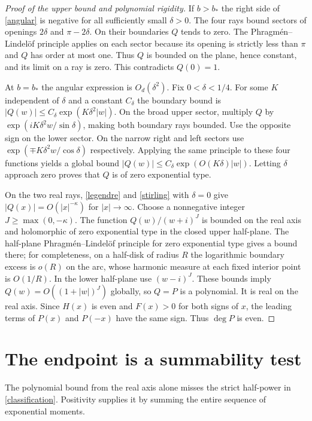 \documentclass[11pt]{article}
\begin{document}
\begin{proof}[Proof of the upper bound and polynomial rigidity]
If $b>b_*$ the right side of \eqref{angular} is negative for all sufficiently small $\delta>0$. The four rays bound sectors of openings $2\delta$ and $\pi-2\delta$. On their boundaries $Q$ tends to zero. The Phragm\'en--Lindel\"of principle applies on each sector because its opening is strictly less than $\pi$ and $Q$ has order at most one. Thus $Q$ is bounded on the plane, hence constant, and its limit on a ray is zero. This contradicts $Q(0)=1$.

At $b=b_*$ the angular expression is $O_d(\delta^2)$. Fix $0<\delta<1/4$. For some $K$ independent of $\delta$ and a constant $C_\delta$ the boundary bound is $|Q(w)|\le C_\delta\exp(K\delta^2|w|)$. On the broad upper sector, multiply $Q$ by $\exp(i K\delta^2 w/\sin\delta)$, making both boundary rays bounded. Use the opposite sign on the lower sector. On the narrow right and left sectors use $\exp(\mp K\delta^2 w/\cos\delta)$ respectively. Applying the same principle to these four functions yields a global bound $|Q(w)|\le C_\delta\exp(O(K\delta)|w|)$. Letting $\delta$ approach zero proves that $Q$ is of zero exponential type.

On the two real rays, \eqref{legendre} and \eqref{stirling} with $\delta=0$ give $|Q(x)|=O(|x|^{-\kappa})$ for $|x|\to\infty$. Choose a nonnegative integer $J\ge\max(0,-\kappa)$. The function $Q(w)/(w+i)^J$ is bounded on the real axis and holomorphic of zero exponential type in the closed upper half-plane. The half-plane Phragm\'en--Lindel\"of principle for zero exponential type gives a bound there; for completeness, on a half-disk of radius $R$ the logarithmic boundary excess is $o(R)$ on the arc, whose harmonic measure at each fixed interior point is $O(1/R)$. In the lower half-plane use $(w-i)^J$. These bounds imply $Q(w)=O((1+|w|)^J)$ globally, so $Q=P$ is a polynomial. It is real on the real axis. Since $H(x)$ is even and $F(x)>0$ for both signs of $x$, the leading terms of $P(x)$ and $P(-x)$ have the same sign. Thus $\deg P$ is even.
\end{proof}

\section{The endpoint is a summability test}
The polynomial bound from the real axis alone misses the strict half-power in \eqref{classification}. Positivity supplies it by summing the entire sequence of exponential moments.
\end{document}
